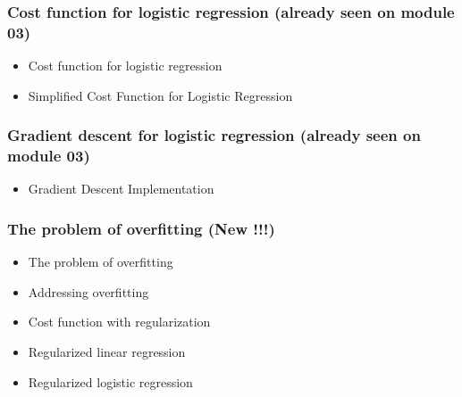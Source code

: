 \subsubsection*{Cost function for logistic regression (already seen on module 03)}
\begin{itemize}
  \item Cost function for logistic regression
  \item Simplified Cost Function for Logistic Regression
\end{itemize}

\subsubsection*{Gradient descent for logistic regression (already seen on module 03)}
\begin{itemize}
  \item Gradient Descent Implementation
\end{itemize}

\subsubsection*{The problem of overfitting (New !!!)}
\begin{itemize}
  \item The problem of overfitting
  \item Addressing overfitting
  \item Cost function with regularization
  \item Regularized linear regression
  \item Regularized logistic regression  
\end{itemize}
